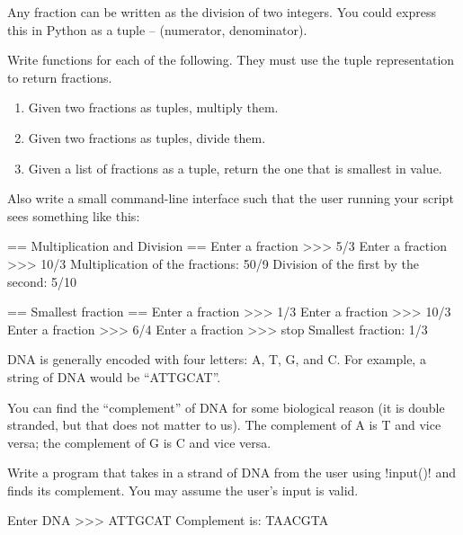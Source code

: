 \documentclass[11pt]{cselabheader}
\begin{document}
\begin{ex}[fractions.py] Any fraction can be written as the division of two
  integers. You could express this in Python as a tuple -- 
  (numerator, denominator).

  Write functions for each of the following. They must use the tuple
  representation to return fractions.
  \begin{enumerate}
    \item Given two fractions as tuples, multiply them.
    \item Given two fractions as tuples, divide them.
    \item Given a list of fractions as a tuple, return the one that is
      smallest in value.
  \end{enumerate}

  Also write a small command-line interface such that the user running your
  script sees something like this:

  \begin{verbatimcode}
== Multiplication and Division ==
Enter a fraction >>> 5/3
Enter a fraction >>> 10/3
Multiplication of the fractions: 50/9
Division of the first by the second: 5/10

== Smallest fraction ==
Enter a fraction >>> 1/3
Enter a fraction >>> 10/3
Enter a fraction >>> 6/4
Enter a fraction >>> stop
Smallest fraction: 1/3
  \end{verbatimcode}
\end{ex}

\begin{ex}[dna.py] 
  DNA is generally encoded with four letters: A, T, G, and C. For example, a
  string of DNA would be ``ATTGCAT''.

  You can find the ``complement'' of DNA for some biological reason (it is
  double stranded, but that does not matter to us). The complement of A is T
  and vice versa; the complement of G is C and vice versa.

  Write a program that takes in a strand of DNA from the user using
  \pythoninline!input()! and finds its complement. You may assume the user's
  input is valid.

  \begin{verbatimcode}
Enter DNA >>> ATTGCAT
Complement is: TAACGTA
\end{verbatimcode}
\end{ex}
\end{document}
